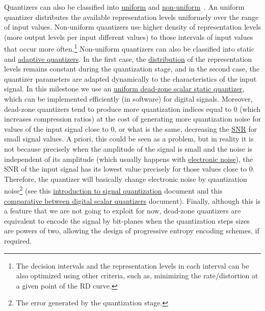 Quantizers can also be classified into
\href{https://en.wikipedia.org/wiki/Quantization_(signal_processing)#Mid-riser_and_mid-tread_uniform_quantizers}{uniform}
and
\href{https://nptel.ac.in/content/storage2/courses/117104069/chapter_5/5_5.html}{non-uniform}~\cite{sayood2017introduction,vetterli2014foundations}. An
uniform quantizer distributes the available representation levels
uniformely over the range of input values. Non-uniform quantizers use
higher density of representation levels (more output levels per input
different values) to those intervals of input values that occur more
often.\footnote{The decision intervals and the representation levels
  in each interval can be also optimized using other criteria, such
  as, minimizing the rate/distortion at a given point of the RD
  curve.}  Non-uniform quantizers can also be classified into static
and
\href{https://en.wikipedia.org/wiki/Adaptive_differential_pulse-code_modulation}{adaptive
  quantizers}. In the first case, the
\href{https://en.wikipedia.org/wiki/Probability_distribution}{distribution}
of the representation levels remains constant during the quantization
stage, and in the second case, the quantizer parameters are adapted
dynamically to the characteristics of the input signal. In this
milestone we use an
\href{https://en.wikipedia.org/wiki/Quantization_(signal_processing)#Dead-zone_quantizers}{uniform
  dead-zone scalar static quantizer}, which can be implemented
efficiently (in software) for digital signals. Moreover, dead-zone
quantizers tend to produce more quantization indices equal to 0 (which
increases compression ratios) at the cost of generating more
quantization noise for values of the input signal close to 0, or what
is the same, decreasing the
\href{https://en.wikipedia.org/wiki/Signal-to-noise_ratio}{SNR} for
small signal values. A priori, this could be seen as a problem, but in
reality it is not because precisely when the amplitude of the signal
is small and the noise is independent of its amplitude (which usually
happens with
\href{https://en.wikipedia.org/wiki/Noise_(electronics)}{electronic
  noise}), the SNR of the input signal has its lowest value precisely
for those values close to 0. Therefore, the quantizer will basically
change electronic noise by quantization noise\footnote{The error
  generated by the quantization stage.} (see this
\href{https://github.com/vicente-gonzalez-ruiz/signal_quantization}{introduction
  to signal quantization} document and this
\href{https://github.com/vicente-gonzalez-ruiz/scalar_quantization}{comparative
  between digital scalar quantizers} document). Finally, although this
is a feature that we are not going to exploit for now, dead-zone
quantizers are equivalent to encode the signal by bit-planes when the
quantization steps sizes are powers of two, allowing the design of
progressive entropy encoding schemes, if required.

